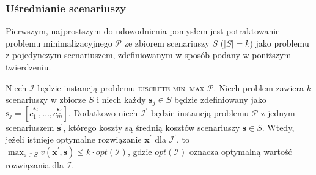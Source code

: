 \subsubsection{Uśrednianie scenariuszy}

Pierwszym, najprostszym do udowodnienia pomysłem jest potraktowanie problemu minimalizacyjnego $\mathcal{P}$ ze zbiorem scenariuszy $S$ ($\left| S \right| = k$) jako problemu z pojedynczym scenariuszem, zdefiniowanym w sposób podany w poniższym twierdzeniu.

\begin{theorem}\label{th:minmaxavg}
	Niech $\mathcal{I}$ będzie instancją problemu \textsc{discrete min--max $\mathcal{P}$}. Niech problem zawiera $k$ scenariuszy w zbiorze $S$ i niech każdy $\textbf{s}_{j} \in S$ będzie zdefiniowany jako $\textbf{s}_{j} = \left[ c^{\textbf{s}_{j}}_{1}, \dots, c^{\textbf{s}_{j}}_{m} \right]$. Dodatkowo niech $\mathcal{I^{\prime}}$ będzie instancją problemu $\mathcal{P}$ z jednym scenariuszem $\textbf{s}^{\prime}$, którego koszty są średnią kosztów scenariuszy $\textbf{s} \in S$. Wtedy, jeżeli istnieje optymalne rozwiązanie $\textbf{x}^{\prime}$ dla $\mathcal{I}^{\prime}$, to $\max_{\textbf{s} \in S} v \left( \textbf{x}^{\prime}, \textbf{s} \right) \leqslant k \cdot opt \left( \mathcal{I} \right)$, gdzie $opt \left( \mathcal{I} \right)$ oznacza optymalną wartość rozwiązania dla $\mathcal{I}$.
\end{theorem}

